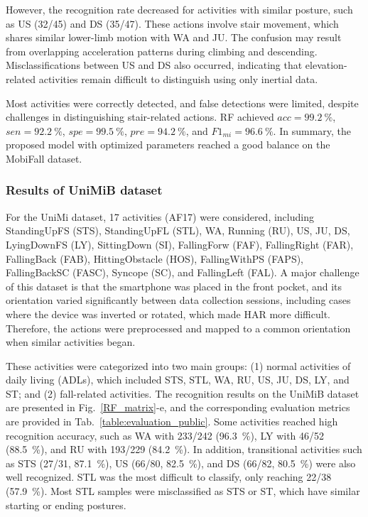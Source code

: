 \documentclass[journal,twoside,web]{ieeecolor}
\begin{document}
However, the recognition rate decreased for activities with similar posture, such as US (32/45) and DS (35/47). These actions involve stair movement, which shares similar lower-limb motion with WA and JU. The confusion may result from overlapping acceleration patterns during climbing and descending. Misclassifications between US and DS also occurred, indicating that elevation-related activities remain difficult to distinguish using only inertial data.

Most activities were correctly detected, and false detections were limited, despite challenges in distinguishing stair-related actions. RF achieved $acc=99.2~\%$, $sen=92.2~\%$, $spe=99.5~\%$, $pre=94.2~\%$, and $F1_{mi}=96.6~\%$. In summary, the proposed model with optimized parameters reached a good balance on the MobiFall dataset.


\subsubsection{Results of UniMiB dataset}

For the UniMi dataset, 17 activities (AF17) were considered, including StandingUpFS (STS), StandingUpFL (STL), WA, Running (RU), US, JU, DS, LyingDownFS (LY), SittingDown (SI), FallingForw (FAF), FallingRight (FAR), FallingBack (FAB), HittingObstacle (HOS), FallingWithPS (FAPS), FallingBackSC (FASC), Syncope (SC), and FallingLeft (FAL). A major challenge of this dataset is that the smartphone was placed in the front pocket, and its orientation varied significantly between data collection sessions, including cases where the device was inverted or rotated, which made HAR more difficult. Therefore, the actions were preprocessed and mapped to a common orientation when similar activities began.

These activities were categorized into two main groups: (1) normal activities of daily living (ADLs), which included STS, STL, WA, RU, US, JU, DS, LY, and ST; and (2) fall-related activities. The recognition results on the UniMiB dataset are presented in Fig.~\ref{RF_matrix}-e, and the corresponding evaluation metrics are provided in Tab.~\ref{table:evaluation_public}. Some activities reached high recognition accuracy, such as WA with 233/242 (96.3~\%), LY with 46/52 (88.5~\%), and RU with 193/229 (84.2~\%). In addition, transitional activities such as STS (27/31, 87.1~\%), US (66/80, 82.5~\%), and DS (66/82, 80.5~\%) were also well recognized. STL was the most difficult to classify, only reaching 22/38 (57.9~\%). Most STL samples were misclassified as STS or ST, which have similar starting or ending postures.
\end{document}
